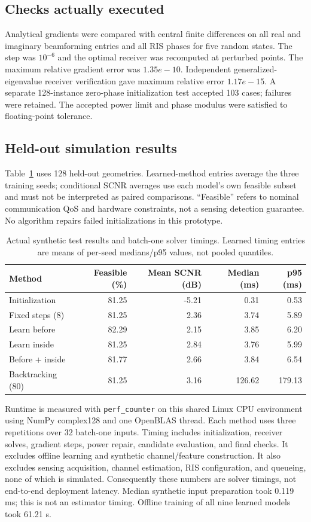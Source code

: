 \subsection{Checks actually executed}
Analytical gradients were compared with central finite differences on all real and imaginary beamforming entries and all RIS phases for five random states. The step was $10^{-6}$ and the optimal receiver was recomputed at perturbed points. The maximum relative gradient error was $1.35e-10$. Independent generalized-eigenvalue receiver verification gave maximum relative error $1.17e-15$. A separate 128-instance zero-phase initialization test accepted 103 cases; failures were retained. The accepted power limit and phase modulus were satisfied to floating-point tolerance.

\subsection{Held-out simulation results}
Table~\ref{tab:results} uses 128 held-out geometries. Learned-method entries average the three training seeds; conditional SCNR averages use each model's own feasible subset and must not be interpreted as paired comparisons. ``Feasible'' refers to nominal communication QoS and hardware constraints, not a sensing detection guarantee. No algorithm repairs failed initializations in this prototype.

\begin{table}[!htbp]\centering\small
\begin{tabular}{lrrrr}\toprule
Method & Feasible (\%) & Mean SCNR (dB) & Median (ms) & p95 (ms)\\\midrule
Initialization & 81.25 & -5.21 & 0.31 & 0.53 \\
Fixed steps (8) & 81.25 & 2.36 & 3.74 & 5.89 \\
Learn before & 82.29 & 2.15 & 3.85 & 6.20 \\
Learn inside & 81.25 & 2.84 & 3.76 & 5.99 \\
Before + inside & 81.77 & 2.66 & 3.84 & 6.54 \\
Backtracking (80) & 81.25 & 3.16 & 126.62 & 179.13 \\
\bottomrule\end{tabular}
\caption{Actual synthetic test results and batch-one solver timings. Learned timing entries are means of per-seed medians/p95 values, not pooled quantiles.}\label{tab:results}\end{table}

Runtime is measured with \texttt{perf\_counter} on this shared Linux CPU environment using NumPy complex128 and one OpenBLAS thread. Each method uses three repetitions over 32 batch-one inputs. Timing includes initialization, receiver solves, gradient steps, power repair, candidate evaluation, and final checks. It excludes offline learning and synthetic channel/feature construction. It also excludes sensing acquisition, channel estimation, RIS configuration, and queueing, none of which is simulated. Consequently these numbers are solver timings, not end-to-end deployment latency. Median synthetic input preparation took 0.119 ms; this is not an estimator timing. Offline training of all nine learned models took 61.21 s.

